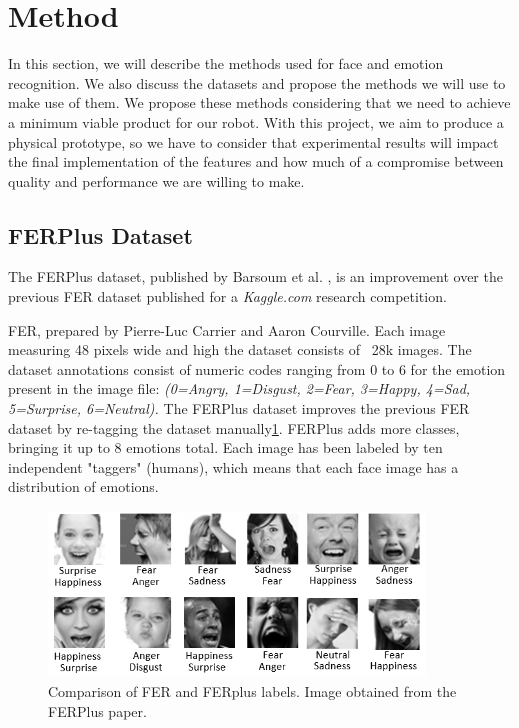 
\section{Method}
In this section, we will describe the methods used for face and emotion recognition. We also discuss the datasets and propose the methods we will use to make use of them. We propose these methods considering that we need to achieve a minimum viable product for our robot. With this project, we aim to produce a physical prototype, so we have to consider that experimental results will impact the final implementation of the features and how much of a compromise between quality and performance we are willing to make. 



\subsection{FERPlus Dataset}

The FERPlus dataset, published by Barsoum et al. \cite{BarsoumICMI2016}, is an improvement over the previous FER\cite{FER2013} dataset published for a \emph{Kaggle.com} research competition.

FER, prepared by Pierre-Luc Carrier and Aaron Courville. Each image measuring 48 pixels wide and high the dataset consists of ~28k images. The dataset annotations consist of numeric codes ranging from 0 to 6 for the emotion present in the image file: \emph{(0=Angry, 1=Disgust, 2=Fear, 3=Happy, 4=Sad, 5=Surprise, 6=Neutral).}
The FERPlus dataset improves the previous FER dataset by re-tagging the dataset manually\ref{fig:fervsferplus}. FERPlus adds more classes, bringing it up to 8 emotions total. Each image has been labeled by ten independent "taggers" (humans), which means that each face image has a distribution of emotions.



\begin{figure}[h]
  \centering
  \includegraphics[width=10cm]{resources/fervsferplus.png}
  \caption{Comparison of FER and FERplus labels. Image obtained from the FERPlus paper\cite{BarsoumICMI2016}.}\label{fig:fervsferplus}
\end{figure}


